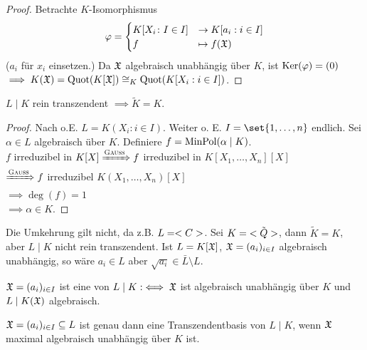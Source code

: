 \begin{proof}
	Betrachte $K$-Isomorphismus
	\begin{align*}
		\varphi = \begin{cases}
			K[X_i \colon I \in I] &\to K[a_i : i \in I]\\
			f & \mapsto f(\mathfrak{X})
		\end{cases} 
	\end{align*}
	($a_i$ für $x_i$ einsetzen.) Da $\mathfrak{X}$ algebraisch unabhängig über $K$, ist $\operatorname{Ker}(\varphi) = (0)$\\
	$\implies K(\mathfrak{X}) = \operatorname{Quot}(K[\mathfrak{X}]) \cong_K \operatorname{Quot}(K[X_i : i \in I])$.
\end{proof}
\begin{proposition}
	$L\mid K$ rein transzendent $\implies \tilde{K} = K$.
\end{proposition}
\begin{proof}
	Nach  o.E. $L = K(X_i : i \in I)$. Weiter o. E. $I = \set{1, \dots,n}$ endlich. Sei $\alpha \in L$ algebraisch über $K$. Definiere $f = \operatorname{MinPol}(\alpha \mid K)$.\\
	$f$ irreduzibel in $K[X] \xRightarrow{\text{\textsc{Gauss}}} f$ irreduzibel in $K[X_1, \dots, X_n][X]$\\
	$\xRightarrow{\text{\textsc{Gauss}}} f$ irreduzibel $K(X_1, \dots, X_n)[X]$\\
	$\implies \deg(f) = 1$\\
	$\implies \alpha \in K$.
\end{proof}
\begin{remark}
	Die Umkehrung gilt nicht, da z.B. $L = <C>$. Sei $K = \tilde{<Q>}$, dann $\tilde{K} = K$, aber $L\mid K$ nicht rein transzendent. Ist $L = K[\mathfrak{X}]$, $\mathfrak{X} = (a_i)_{i\in I}$ algebraisch unabhängig, so wäre $a_i \in L$ aber $\sqrt{a_i} \in \bar{L}\setminus L$.
\end{remark}
\begin{definition}[Transzendentbasis]
	$\mathfrak{X} = (a_i)_{i\in I}$ ist eine  von $L \mid K : \iff \mathfrak{X}$ ist algebraisch unabhängig über $K$ und $L\mid K(\mathfrak{X})$ algebraisch.
\end{definition}
\begin{lemma}
	$\mathfrak{X} = (a_i)_{i \in I} \subseteq L$ ist genau dann eine Transzendentbasis von $L \mid K$, wenn $\mathfrak{X}$ maximal algebraisch unabhängig über $K$ ist.
\end{lemma}
